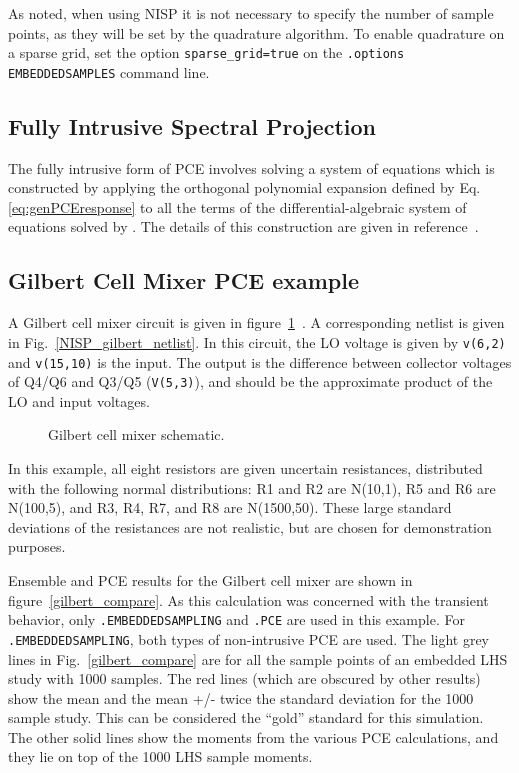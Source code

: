 As noted, when using NISP it is not necessary to specify the number of sample points, as they will
be set by the quadrature algorithm.  To enable quadrature on a sparse grid, set the 
option \texttt{sparse\_grid=true} on the \texttt{.options EMBEDDEDSAMPLES} command line.

\subsection{Fully Intrusive Spectral Projection}
\label{intrusivePCE}
The fully intrusive form of PCE involves solving a system of equations which is constructed by 
applying the orthogonal polynomial expansion defined by 
Eq. \eqref{eq:genPCEresponse} to all the terms of the differential-algebraic 
system of equations solved by \Xyce{}.  The details of this construction are given in 
reference~\cite{xyceAdvancedUQ}.

\clearpage
\subsection{Gilbert Cell Mixer PCE example}
\label{xyceGilbertCell}
A Gilbert cell mixer circuit is given in figure~\ref{gilbert}~\cite{1049925}.  A corresponding netlist 
is given in Fig.~\ref{NISP_gilbert_netlist}.
In this circuit, the LO voltage is given by \texttt{v(6,2)} and \texttt{v(15,10)} is the input. 
The output is the difference between collector voltages of Q4/Q6 and Q3/Q5 (\texttt{V(5,3)}), 
and should be the approximate product of the LO and input voltages.
\begin{figure}[hbt]
\centering
\resizebox{.9\linewidth}{!}{ }
  \caption[Gilbert cell mixer schematic]
  {Gilbert cell mixer schematic.}
\label{gilbert}
\end{figure}
In this example, all eight 
resistors are given uncertain resistances, distributed with the following normal distributions:  R1 and R2 are N(10,1), 
R5 and R6 are N(100,5), and R3, R4, R7, and R8 are N(1500,50).  These large standard deviations of the resistances are 
not realistic, but are chosen for demonstration purposes.

Ensemble and PCE results for the Gilbert cell mixer are shown in figure~\ref{gilbert_compare}.   
As this calculation was concerned with the transient behavior, only \texttt{.EMBEDDEDSAMPLING} 
and \texttt{.PCE} are used in this example.  For \texttt{.EMBEDDEDSAMPLING}, both types of 
non-intrusive PCE are used.
The light grey lines in Fig.~\ref{gilbert_compare} are for all the sample points 
of an embedded LHS study with 1000 samples.    The red lines (which are obscured 
by other results) show the mean and the mean +/- twice the standard deviation for the 
1000 sample study.  This can be considered the ``gold'' standard for this simulation.
The other solid lines show the moments from the various PCE calculations, and they 
lie on top of the 1000 LHS sample moments.  

